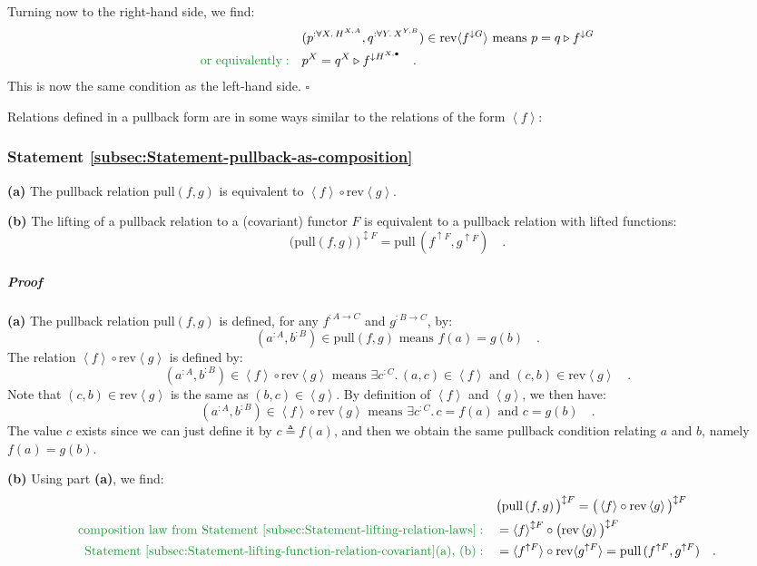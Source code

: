 Turning now to the right-hand side, we find:
\begin{align*}
 & (p^{:\forall X.\,H^{X,A}},q^{:\forall Y.\,X^{Y,B}})\in\text{rev}\langle f^{\downarrow G}\rangle\text{ means }p=q\triangleright f^{\downarrow G}\\
{\color{greenunder}\text{or equivalently}:}\quad & p^{X}=q^{X}\triangleright f^{\downarrow H^{X,\bullet}}\quad.
\end{align*}
This is now the same condition as the left-hand side. $\square$

Relations defined in a pullback form are in some ways similar to the
relations of the form $\left<f\right>$:

\subsubsection{Statement \label{subsec:Statement-pullback-as-composition}\ref{subsec:Statement-pullback-as-composition}}

\textbf{(a)} The pullback relation $\text{pull}\left(f,g\right)$
is equivalent to $\left<f\right>\circ\text{rev}\left<g\right>$.

\textbf{(b)} The lifting of a pullback relation to a (covariant) functor
$F$ is equivalent to a pullback relation with lifted functions:
\[
\big(\text{pull}\left(f,g\right)\big)^{\updownarrow F}=\text{pull}\,(f^{\uparrow F},g^{\uparrow F})\quad.
\]


\subparagraph{Proof}

\textbf{(a)} The pullback relation $\text{pull}\left(f,g\right)$
is defined, for any $f^{:A\rightarrow C}$ and $g^{:B\rightarrow C}$,
by:
\[
(a^{:A},b^{:B})\in\text{pull}\left(f,g\right)\text{ means }f(a)=g(b)\quad.
\]
The relation $\left<f\right>\circ\text{rev}\left<g\right>$ is defined
by:
\[
(a^{:A},b^{:B})\in\left<f\right>\circ\text{rev}\left<g\right>\text{ means }\exists c^{:C}.\,(a,c)\in\left<f\right>\text{ and }(c,b)\in\text{rev}\left<g\right>\quad.
\]
Note that $(c,b)\in\text{rev}\left<g\right>$ is the same as $(b,c)\in\left<g\right>$.
By definition of $\left<f\right>$ and $\left<g\right>$, we then
have:
\[
(a^{:A},b^{:B})\in\left<f\right>\circ\text{rev}\left<g\right>\text{ means }\exists c^{:C}.\,c=f(a)\text{ and }c=g(b)\quad.
\]
The value $c$ exists since we can just define it by $c\triangleq f(a)$,
and then we obtain the same pullback condition relating $a$ and $b$,
namely $f(a)=g(b)$.

\textbf{(b)} Using part \textbf{(a)}, we find:
\begin{align*}
 & \big(\text{pull}\left(f,g\right)\big)^{\updownarrow F}=\big(\left<f\right>\circ\text{rev}\left<g\right>\big)^{\updownarrow F}\\
{\color{greenunder}\text{composition law from Statement~\ref{subsec:Statement-lifting-relation-laws}}:}\quad & =\left<f\right>^{\updownarrow F}\circ\big(\text{rev}\left<g\right>\big)^{\updownarrow F}\\
{\color{greenunder}\text{Statement~\ref{subsec:Statement-lifting-function-relation-covariant}(a), (b)}:}\quad & =\langle f^{\uparrow F}\rangle\circ\text{rev}\langle g^{\uparrow F}\rangle=\text{pull}\,(f^{\uparrow F},g^{\uparrow F})\quad.
\end{align*}



